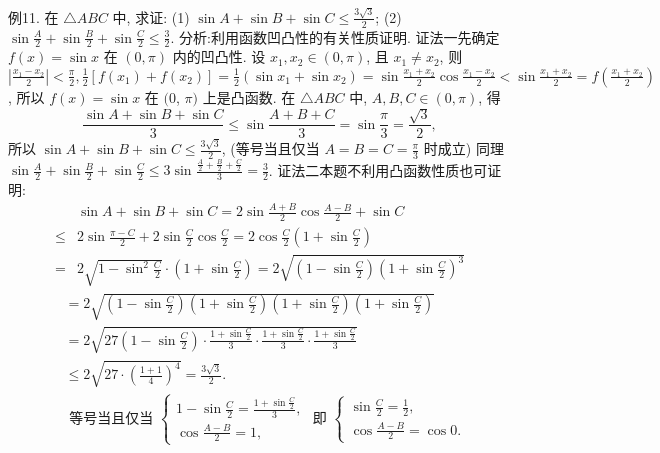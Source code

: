 例11. 在 $\triangle A B C$ 中, 求证: (1) $\sin A+\sin B+\sin C \leqslant \frac{3 \sqrt{3}}{2}$;
(2) $\sin \frac{A}{2}+\sin \frac{B}{2}+\sin \frac{C}{2} \leqslant \frac{3}{2}$.
分析:利用函数凹凸性的有关性质证明.
证法一先确定 $f(x)=\sin x$ 在 $(0, \pi)$ 内的凹凸性.
设 $x_1, x_2 \in(0, \pi)$, 且 $x_1 \neq x_2$, 则 $\left|\frac{x_1-x_2}{2}\right|<\frac{\pi}{2}, \frac{1}{2}\left[f\left(x_1\right)+f\left(x_2\right)\right]=\frac{1}{2}\left(\sin x_1+\sin x_2\right)= \sin \frac{x_1+x_2}{2} \cos \frac{x_1-x_2}{2}<\sin \frac{x_1+x_2}{2}=f\left(\frac{x_1+x_2}{2}\right)$, 所以 $f(x)=\sin x$ 在 $(0$, $\pi)$ 上是凸函数.
在 $\triangle A B C$ 中, $A, B, C \in(0, \pi)$, 得
$$
\frac{\sin A+\sin B+\sin C}{3} \leqslant \sin \frac{A+B+C}{3}=\sin \frac{\pi}{3}=\frac{\sqrt{3}}{2},
$$
所以 $\sin A+\sin B+\sin C \leqslant \frac{3 \sqrt{3}}{2}$, (等号当且仅当 $A=B=C=\frac{\pi}{3}$ 时成立)
同理 $\sin \frac{A}{2}+\sin \frac{B}{2}+\sin \frac{C}{2} \leqslant 3 \sin \frac{\frac{A}{2}+\frac{B}{2}+\frac{C}{2}}{3}=\frac{3}{2}$.
证法二本题不利用凸函数性质也可证明:
$$
\begin{aligned}
& \sin A+\sin B+\sin C=2 \sin \frac{A+B}{2} \cos \frac{A-B}{2}+\sin C \\
\leqslant & 2 \sin \frac{\pi-C}{2}+2 \sin \frac{C}{2} \cos \frac{C}{2}=2 \cos \frac{C}{2}\left(1+\sin \frac{C}{2}\right) \\
= & 2 \sqrt{1-\sin ^2 \frac{C}{2}} \cdot\left(1+\sin \frac{C}{2}\right)=2 \sqrt{\left(1-\sin \frac{C}{2}\right)\left(1+\sin \frac{C}{2}\right)^3}
\end{aligned}
$$
$$
\begin{aligned}
& =2 \sqrt{\left(1-\sin \frac{C}{2}\right)\left(1+\sin \frac{C}{2}\right)\left(1+\sin \frac{C}{2}\right)\left(1+\sin \frac{C}{2}\right)} \\
& =2 \sqrt{27\left(1-\sin \frac{C}{2}\right) \cdot \frac{1+\sin \frac{C}{2}}{3} \cdot \frac{1+\sin \frac{C}{2}}{3} \cdot \frac{1+\sin \frac{C}{2}}{3}} \\
& \leqslant 2 \sqrt{27 \cdot\left(\frac{1+1}{4}\right)^4}=\frac{3 \sqrt{3}}{2} . \\
& \text { 等号当且仅当 }\left\{\begin{array} { l } 
{ 1 - \operatorname { s i n } \frac { C } { 2 } = \frac { 1 + \operatorname { s i n } \frac { C } { 2 } } { 3 } , } \\
{ \operatorname { c o s } \frac { A - B } { 2 } = 1 , }
\end{array} \text { 即 } \left\{\begin{array}{l}
\sin \frac{C}{2}=\frac{1}{2}, \\
\cos \frac{A-B}{2}=\cos 0 .
\end{array} \right.\right.
\end{aligned}
$$
